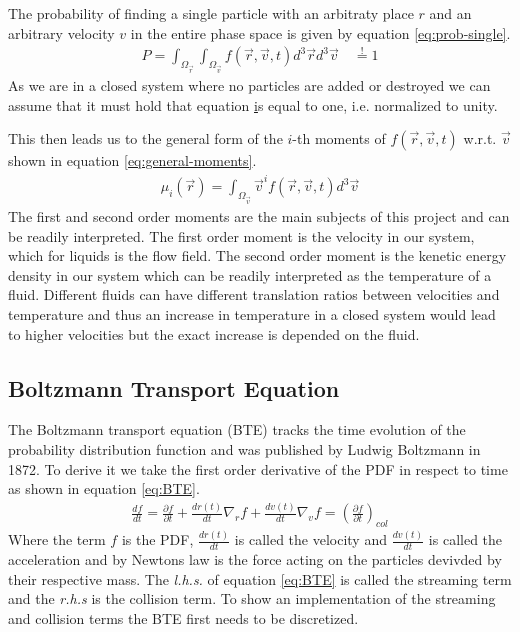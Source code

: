 \documentclass[a4paper,11pt]{article}
\begin{document}
The probability of finding a single particle with an arbitraty place $r$ and an arbitrary velocity $v$ in the entire phase space is given by equation \ref{eq:prob-single}.
\begin{equation}
  \label{eq:prob-single}
  \begin{aligned}
    P = \int_{\Omega_{\vec{r}}} \int_{\Omega_{\vec{v}}}  f(\vec{r},\vec{v},t) d^{3}\vec{r} d^{3}\vec{v} \quad \overset{!}{=} 1
  \end{aligned}
\end{equation}
As we are in a closed system where no particles are added or destroyed we can assume that it must hold that equation \href{eq:prob-single} is equal to one, i.e. normalized to unity.

This then leads us to the general form of the $i$-th moments of $ f(\vec{r},\vec{v},t) $ w.r.t. $ \vec{v} $ shown in equation \ref{eq:general-moments}.
\begin{equation}
  \label{eq:general-moments}
  \begin{aligned}
    \mu_{i}(\vec{r}) =\int_{\Omega_{\vec{v}}}\vec{v}^{i} f(\vec{r},\vec{v},t)d^{3}\vec{v}
  \end{aligned}
\end{equation}
The first and second order moments are the main subjects of this project and can be readily interpreted.
The first order moment is the velocity in our system, which for liquids is the flow field.
The second order moment is the kenetic energy density in our system which can be readily interpreted as the temperature of a fluid.
Different fluids can have different translation ratios between velocities and temperature and thus an increase in temperature in a closed system would lead to higher velocities but the exact increase is depended on the fluid.


\subsection{Boltzmann Transport Equation}
The Boltzmann transport equation (BTE) tracks the time evolution of the probability distribution function and was published by Ludwig Boltzmann in 1872.
To derive it we take the first order derivative of the PDF in respect to time as shown in
equation \ref{eq:BTE}.
\begin{equation}
  \label{eq:BTE}
  \begin{aligned}
    \frac{df}{dt} =\frac{\partial f}{\partial t} + \frac{dr(t)}{dt} \nabla_{r}f + \frac{dv(t)}{dt} \nabla_{v}f = \left( \frac{\partial f}{\partial t} \right)_{col}
  \end{aligned}
\end{equation}
Where the term $f$ is the PDF, $\frac{dr(t)}{dt}$ is called the velocity and $\frac{dv(t)}{dt}$ is called the acceleration and by Newtons law is the force acting on the particles devivded by their respective mass.
The \textit{l.h.s.} of equation \ref{eq:BTE} is called the streaming term and the \textit{r.h.s} is the collision term.
To show an implementation of the streaming and collision terms the BTE first needs to be discretized.
\end{document}
